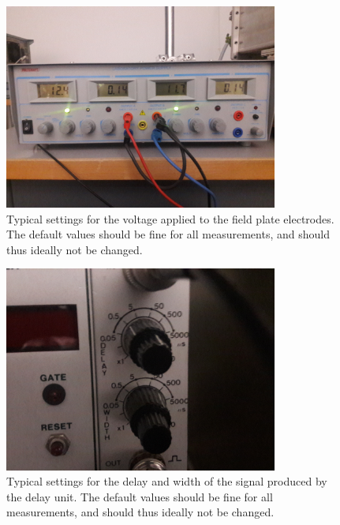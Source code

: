 \documentclass[12pt]{article}
\begin{document}
\begin{figure}[H]
    \centering
    \includegraphics[width = 9cm]{pics/field_plate_generator.jpg}
    \caption{\small Typical settings for the voltage applied to the field plate electrodes. The default values should be fine for all measurements, and should thus ideally not be changed.}
    \label{fig:field_plate_generator}
\end{figure}
\begin{figure}[H]
    \centering
    \includegraphics[width = 9cm]{pics/delay_unit.jpg}
    \caption{\small Typical settings for the delay and width of the signal produced by the delay unit. The default values should be fine for all measurements, and should thus ideally not be changed.}
    \label{fig:delay_unit}
\end{figure}
\end{document}
